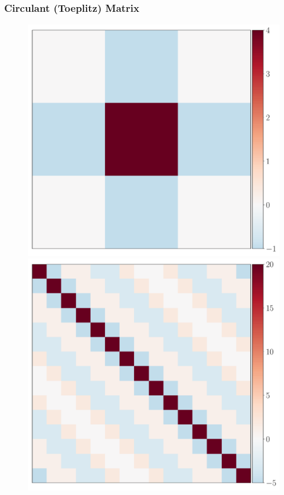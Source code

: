 \documentclass[aspectratio=169]{beamer}
\begin{document}
\begin{frame}
  \frametitle{Circulant (Toeplitz) Matrix}
\begin{figure}
  \centering
  \mbox{{\includegraphics[scale=0.17]{src/images/circulant_filter.pdf}}}
  \mbox{{\includegraphics[scale=0.17]{src/images/circulant_DTD.pdf}}}

\end{figure}
\end{frame}
\end{document}
